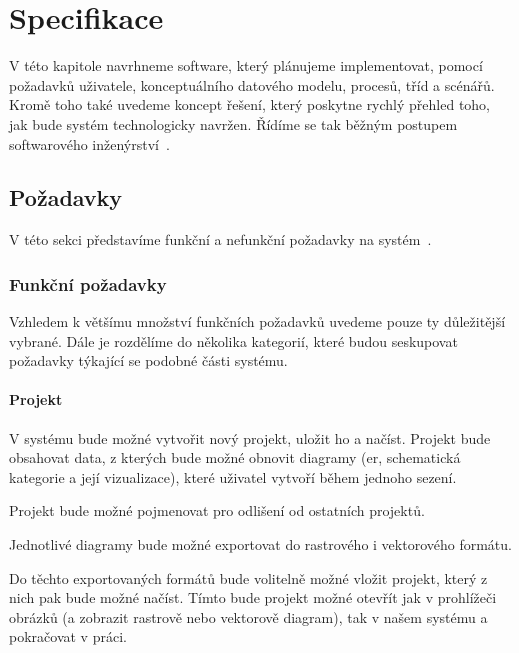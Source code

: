 \chapter{Specifikace}\label{chapter:specifikace}

V této kapitole navrhneme software, který plánujeme implementovat, pomocí požadavků uživatele, konceptuálního datového modelu, procesů, tříd a scénářů.
Kromě toho také uvedeme koncept řešení, který poskytne rychlý přehled toho, jak bude systém technologicky navržen.
Řídíme se tak běžným postupem softwarového inženýrství~\cite{sommerville_softwareengineering_2011}.

\section{Požadavky}

V této sekci představíme funkční a nefunkční požadavky na systém~\cite[s.~83]{sommerville_softwareengineering_2011}.

\subsection{Funkční požadavky}
Vzhledem k většímu množství funkčních požadavků uvedeme pouze ty důležitější vybrané.
Dále je rozdělíme do několika kategorií, které budou seskupovat požadavky týkající se podobné části systému.


\subsubsection*{Projekt}
\begin{enumfp}
  \item V systému bude možné vytvořit nový projekt, uložit ho a načíst.
  Projekt bude obsahovat data, z kterých bude možné obnovit diagramy (\acrshort{er}, schematická kategorie a její vizualizace), které uživatel vytvoří během jednoho sezení.
  \item Projekt bude možné pojmenovat pro odlišení od ostatních projektů.
  \item Jednotlivé diagramy bude možné exportovat do rastrového i vektorového formátu.
  \item Do těchto exportovaných formátů bude volitelně možné vložit projekt, který z nich pak bude možné načíst.
  Tímto bude projekt možné otevřít jak v prohlížeči obrázků (a zobrazit rastrově nebo vektorově diagram), tak v našem systému a pokračovat v práci.
\end{enumfp}

